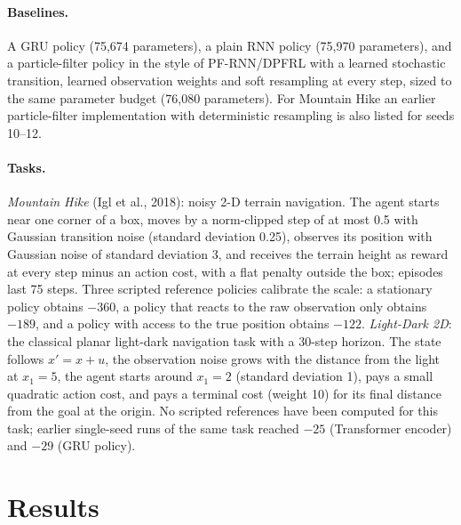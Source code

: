 \documentclass[11pt]{article}
\begin{document}
\paragraph{Baselines.}
A GRU policy (75{,}674 parameters), a plain RNN policy (75{,}970 parameters), and a particle-filter policy in the style of PF-RNN/DPFRL with a learned stochastic transition, learned observation weights and soft resampling at every step, sized to the same parameter budget (76{,}080 parameters). For Mountain Hike an earlier particle-filter implementation with deterministic resampling is also listed for seeds 10--12.

\paragraph{Tasks.}
\emph{Mountain Hike} (Igl et al., 2018): noisy 2-D terrain navigation. The agent starts near one corner of a box, moves by a norm-clipped step of at most 0.5 with Gaussian transition noise (standard deviation 0.25), observes its position with Gaussian noise of standard deviation 3, and receives the terrain height as reward at every step minus an action cost, with a flat penalty outside the box; episodes last 75 steps. Three scripted reference policies calibrate the scale: a stationary policy obtains $-360$, a policy that reacts to the raw observation only obtains $-189$, and a policy with access to the true position obtains $-122$. \emph{Light-Dark 2D}: the classical planar light-dark navigation task with a 30-step horizon. The state follows $x' = x + u$, the observation noise grows with the distance from the light at $x_1 = 5$, the agent starts around $x_1 = 2$ (standard deviation 1), pays a small quadratic action cost, and pays a terminal cost (weight 10) for its final distance from the goal at the origin. No scripted references have been computed for this task; earlier single-seed runs of the same task reached $-25$ (Transformer encoder) and $-29$ (GRU policy).

\section{Results}
\end{document}
